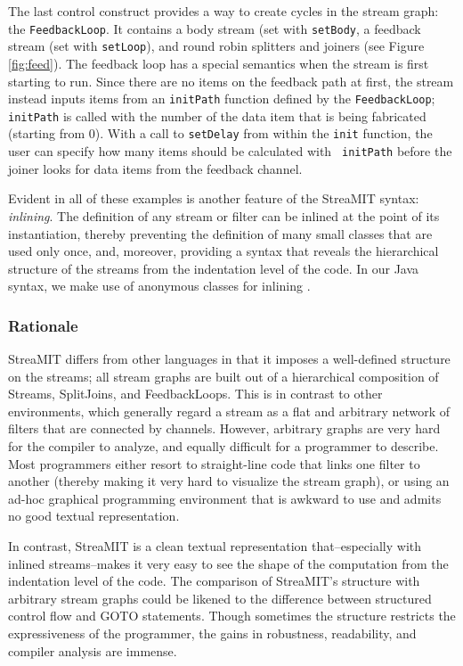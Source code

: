 The last control construct provides a way to create cycles in the
stream graph: the {\tt FeedbackLoop}.  It contains a body stream (set
with {\tt setBody}, a feedback stream (set with {\tt setLoop}), and
round robin splitters and joiners (see Figure \ref{fig:feed}).  The
feedback loop has a special semantics when the stream is first
starting to run.  Since there are no items on the feedback path at
first, the stream instead inputs items from an {\tt initPath} function
defined by the {\tt FeedbackLoop}; {\tt initPath} is called with the
number of the data item that is being fabricated (starting from 0).
With a call to {\tt setDelay} from within the {\tt init} function, the
user can specify how many items should be calculated with {\tt
initPath} before the joiner looks for data items from the feedback
channel.

Evident in all of these examples is another feature of the StreaMIT
syntax: {\it inlining}.  The definition of any stream or filter can be
inlined at the point of its instantiation, thereby preventing the
definition of many small classes that are used only once, and,
moreover, providing a syntax that reveals the hierarchical structure
of the streams from the indentation level of the code.  In our Java
syntax, we make use of anonymous classes for inlining \cite{java}.

\subsubsection{Rationale}

StreaMIT differs from other languages in that it imposes a
well-defined structure on the streams; all stream graphs are built out
of a hierarchical composition of Streams, SplitJoins, and
FeedbackLoops.  This is in contrast to other environments, which
generally regard a stream as a flat and arbitrary network of filters
that are connected by channels.  However, arbitrary graphs are very
hard for the compiler to analyze, and equally difficult for a
programmer to describe.  Most programmers either resort to
straight-line code that links one filter to another (thereby making it
very hard to visualize the stream graph), or using an ad-hoc graphical
programming environment that is awkward to use and admits no good
textual representation.

In contrast, StreaMIT is a clean textual representation
that--especially with inlined streams--makes it very easy to see the
shape of the computation from the indentation level of the code.  The
comparison of StreaMIT's structure with arbitrary stream graphs could
be likened to the difference between structured control flow and GOTO
statements.  Though sometimes the structure restricts the
expressiveness of the programmer, the gains in robustness,
readability, and compiler analysis are immense.

